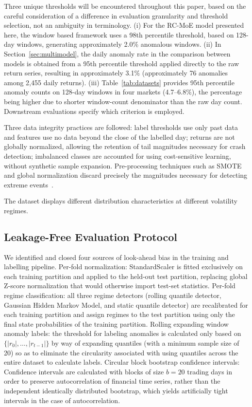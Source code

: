 \documentclass[]{interact}
\begin{document}
Three unique thresholds will be encountered throughout this
paper, based on the careful consideration of a difference in
evaluation granularity and threshold selection, not an ambiguity in
terminology. (i) For the RC-MoE model presented here, the
window based framework uses a 98th percentile threshold,
based on 128-day windows, generating approximately 2.0\%
anomalous windows. (ii) In Section~\ref{sec:multimodel}, the daily anomaly rate in
the comparison between models is obtained from a 95th percentile
threshold applied directly to the raw return series, resulting in
approximately 3.1\% (approximately 76 anomalies among 2{,}455 daily
returns). (iii) Table~\ref{tab:datasets} provides 95th percentile anomaly counts on
128-day windows in four markets (4.7--6.8\%), the percentage being
higher due to shorter window-count denominator than the raw day
count. Downstream evaluations specify which criterion is employed.

Three data integrity practices are followed: label thresholds use only past data and features use no data beyond the close of the labelled day; returns are not globally
normalized, allowing the retention of tail magnitudes necessary for
crash detection; imbalanced classes are accounted for using cost-sensitive learning, without synthetic sample expansion. Pre-processing
techniques such as SMOTE and global normalization discard precisely
the magnitudes necessary for detecting extreme events~\citep{bouchaud2001more}.

The dataset displays different distribution characteristics at
different volatility regimes.

\subsection{Leakage-Free Evaluation Protocol}
\label{sec:leakage_free}
We identified and closed four sources of look-ahead bias in the training and labelling pipeline. Per-fold normalization: StandardScaler is fitted exclusively on each training partition and applied to the held-out test partition, replacing global Z-score normalization that would otherwise import test-set statistics. Per-fold regime classification: all three regime detectors (rolling quantile detector, Gaussian Hidden Markov Model, and static quantile detector) are recalibrated for each training partition and assign regimes to the test partition using only the final state probabilities of the training partition. Rolling expanding window anomaly labels: the threshold for labeling anomalies is calculated only based on $\{|r_0|, \ldots, |r_{t-1}|\}$ by way of expanding quantiles (with a minimum sample size of 20) so as to eliminate the circularity associated with using quantiles across the entire dataset to calculate labels.  Circular block bootstrap confidence intervals: Confidence intervals are calculated with blocks of size $b = 20$ trading days in order to preserve autocorrelation of financial time series, rather than the independent identically distributed bootstrap, which yields artificially tight intervals in the case of autocorrelation.
\end{document}
